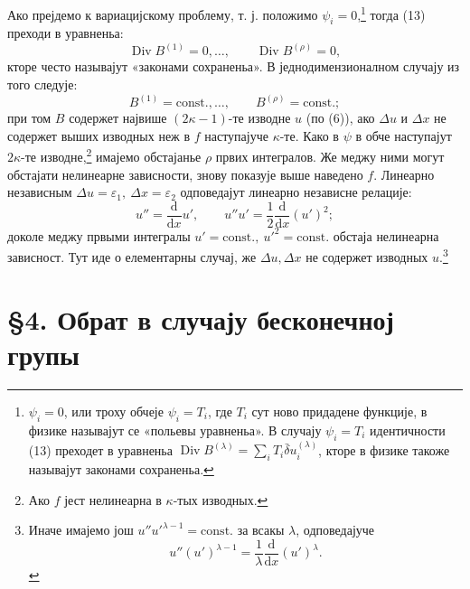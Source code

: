 ﻿\documentclass[11pt]{article}
\providecommand{\eps}{\varepsilon}
\providecommand{\D}{\Delta}
\providecommand{\dd}{\mathrm d}
\DeclareMathOperator{\Div}{Div}
\providecommand{\bd}{\bar{\delta}}
\begin{document}
Ако прејдемо к вариацијскому проблему, т. ј. положимо \(\psi_i=0\),\footnote{\(\psi_i=0\), или троху обчеје \(\psi_i=T_i\), где \(T_i\) сут ново придадене функције, в физике называјут се «польевы уравненьа». В случају \(\psi_i=T_i\) идентичности (13) преходет в уравненьа \(\Div B^{(\lambda)}=\sum_i T_i\bd u_i^{(\lambda)}\), кторе в физике такоже называјут законами сохраненьа.} тогда (13) преходи в уравненьа:
\[
\Div B^{(1)}=0,\ldots,\qquad \Div B^{(\rho)}=0,
\]
кторе често называјут «законами сохраненьа». В једнодимензионалном случају из того следује:
\[
B^{(1)}=\mathrm{const.},\ldots,\qquad B^{(\rho)}=\mathrm{const.};
\]
при том \(B\) содержет највише \((2\kappa-1)\)-те изводне \(u\) (по (6)), ако \(\D u\) и \(\D x\) не содержет выших изводных неж в \(f\) наступајуче \(\kappa\)-те. Како в \(\psi\) в обче наступајут \(2\kappa\)-те изводне,\footnote{Ако \(f\) јест нелинеарна в \(\kappa\)-тых изводных.} имајемо обстајанье \(\rho\) првих интегралов. Же меджу ними могут обстајати нелинеарне зависности, знову показује выше наведено \(f\). Линеарно независным \(\D u=\eps_1,\ \D x=\eps_2\) одповедајут линеарно независне релације:
\[
u''=\frac{\dd}{\dd x}u',\qquad
u''u'=\frac12\frac{\dd}{\dd x}(u')^2;
\]
доколе меджу првыми интегралы \(u'=\mathrm{const.},\ u'^2=\mathrm{const.}\) обстаја нелинеарна зависност. Тут иде о елементарны случај, же \(\D u,\D x\) не содержет изводных \(u\).\footnote{Иначе имајемо још \(u''u'^{\lambda-1}=\mathrm{const.}\) за всакы \(\lambda\), одповедајуче
\[
u''(u')^{\lambda-1}=\frac1\lambda\frac{\dd}{\dd x}(u')^\lambda.
\]}

\section*{\S{}4. Обрат в случају бесконечној групы}
\end{document}
